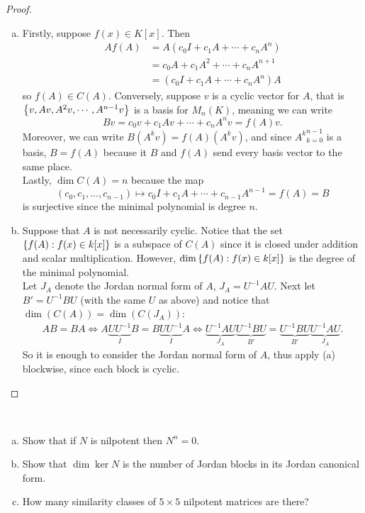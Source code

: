 \documentclass{article}
\begin{document}
\begin{proof}
\begin{enumerate}[(a)]
    \item Firstly, suppose $f(x) \in K[x]$. Then \begin{align*}
      Af(A) &= A(c_0I + c_1A + \cdots + c_nA^n) \\
        &= c_0A + c_1A^2 + \cdots + c_nA^{n+1} \\
        &= (c_0I + c_1A + \cdots + c_nA^n)A
    \end{align*} so $f(A) \in C(A)$.
    Conversely, suppose $v$ is a cyclic vector for $A$, that is
    $\left\{ v, Av, A^2v, \cdots, A^{n-1}v \right\}$ is a basis for $M_n(K)$, meaning we can write \[
      Bv = c_0v + c_1Av + \cdots + c_nA^nv = f(A)v.
    \]
    Moreover, we can write $B(A^kv) = f(A)(A^kv)$, and since ${A^k}_{k=0}^{n-1}$
    is a basis, $B = f(A)$ because it $B$ and $f(A)$ send every basis vector to
    the same place.
    \\
    Lastly, $\dim C(A) = n$ because the map \[
      (c_0, c_1, \hdots, c_{n-1}) \mapsto c_0I + c_1A + \cdots + c_{n-1}A^{n-1} = f(A) = B
    \]
    is surjective since the minimal polynomial is degree $n$.
    \item Suppose that $A$ is not necessarily cyclic. Notice that the set
    $\left\{ f(A) : f(x) \in k[x] \right\}$ is a subspace of $C(A)$ since it is closed
    under addition and scalar multiplication. However,
    $\dim\left\{ f(A) : f(x) \in k[x] \right\}$ is the degree of the minimal polynomial.
    \\
    Let $J_A$ denote the Jordan normal form of $A$, $J_A = U^{-1}AU$. Next
    let $B' = U^{-1}BU$ (with the same $U$ as above) and notice that
    $\dim(C(A)) = \dim(C(J_A))$: \begin{align*}
      AB = BA \Leftrightarrow
      A\underbrace{UU^{-1}}_IB = B\underbrace{UU^{-1}}_IA
      \Leftrightarrow \underbrace{U^{-1}AU}_{J_A} \underbrace{U^{-1}BU}_{B'} = \underbrace{U^{-1}BU}_{B'}\underbrace{U^{-1}AU}_{J_A}.
    \end{align*}
    So it is enough to consider the Jordan normal form of $A$, thus apply (a)
    blockwise, since each block is cyclic.
  \end{enumerate}
\end{proof}
\begin{problem}{3} ~
  \begin{enumerate}[(a)]
    \item Show that if $N$ is nilpotent then $N^n = 0$.
    \item Show that $\dim \ker N$ is the number of Jordan blocks in its Jordan canonical form.
    \item How many similarity classes of $5 \times 5$ nilpotent matrices are there?
  \end{enumerate}
\end{problem}
\end{document}
